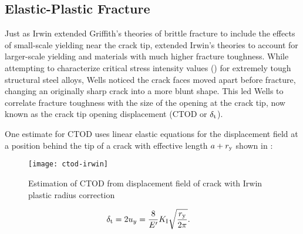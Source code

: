 \subsection{Elastic-Plastic Fracture}

Just as Irwin extended Griffith's theories of brittle fracture to include the effects of small-scale yielding near the crack tip, \citet{wells1961} extended Irwin's theories to account for larger-scale yielding and materials with much higher fracture toughness.
While attempting to characterize critical stress intensity values (\KIc) for extremely tough structural steel alloys, Wells noticed the crack faces moved apart before fracture, changing an originally sharp crack into a more blunt shape.
This led Wells to correlate fracture toughness with the size of the opening at the crack tip, now known as the crack tip opening displacement (CTOD or \(\delta_\textnormal{t}\)).

One estimate for CTOD uses linear elastic equations for the displacement field at a position \ry behind the tip of a crack with effective length \(a+r_{\textnormal{y}}\) shown in :
\begin{figure}[tbp]
\centering
\texttt{[image: ctod-irwin]}
\caption[Estimation of CTOD from displacement field of crack with Irwin plastic radius correction]{\label{fig:ctod-irwin} Estimation of CTOD from displacement field of crack with Irwin plastic radius correction \citep{anderson2005}}
\end{figure}
\begin{align}
\delta_\textnormal{t} &= 2 u_{y} = \frac{8}{E'} K_\textnormal{I} \sqrt{\frac{r_{\textnormal{y}}}{2\pi}} . \label{eq:ctod-irwin}
\end{align}

